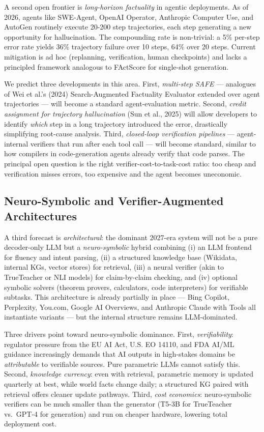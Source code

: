 \documentclass{article}
\begin{document}
A second open frontier is \emph{long-horizon factuality} in agentic deployments. As of 2026, agents like SWE-Agent, OpenAI Operator, Anthropic Computer Use, and AutoGen routinely execute 20-200 step trajectories, each step generating a new opportunity for hallucination. The compounding rate is non-trivial: a 5\% per-step error rate yields 36\% trajectory failure over 10 steps, 64\% over 20 steps. Current mitigation is ad hoc (replanning, verification, human checkpoints) and lacks a principled framework analogous to FActScore for single-shot generation.

We predict three developments in this area. First, \emph{multi-step SAFE} --- analogues of Wei et al.'s (2024) Search-Augmented Factuality Evaluator extended over agent trajectories --- will become a standard agent-evaluation metric. Second, \emph{credit assignment for trajectory hallucination} (Sun et al., 2025) will allow developers to identify \emph{which} step in a long trajectory introduced the error, drastically simplifying root-cause analysis. Third, \emph{closed-loop verification pipelines} --- agent-internal verifiers that run after each tool call --- will become standard, similar to how compilers in code-generation agents already verify that code parses. The principal open question is the right verifier-cost-to-task-cost ratio: too cheap and verification misses errors, too expensive and the agent becomes uneconomic.

\subsection{Neuro-Symbolic and Verifier-Augmented Architectures}\label{neuro-symbolic-and-verifier-augmented-architectures}

A third forecast is \emph{architectural}: the dominant 2027-era system will not be a pure decoder-only LLM but a \emph{neuro-symbolic} hybrid combining (i) an LLM frontend for fluency and intent parsing, (ii) a structured knowledge base (Wikidata, internal KGs, vector stores) for retrieval, (iii) a neural verifier (akin to TrueTeacher or NLI models) for claim-by-claim checking, and (iv) optional symbolic solvers (theorem provers, calculators, code interpreters) for verifiable subtasks. This architecture is already partially in place --- Bing Copilot, Perplexity, You.com, Google AI Overviews, and Anthropic Claude with Tools all instantiate variants --- but the internal structure remains LLM-dominated.

Three drivers point toward neuro-symbolic dominance. First, \emph{verifiability}: regulator pressure from the EU AI Act, U.S. EO 14110, and FDA AI/ML guidance increasingly demands that AI outputs in high-stakes domains be \emph{attributable} to verifiable sources. Pure parametric LLMs cannot satisfy this. Second, \emph{knowledge currency}: even with retrieval, parametric memory is updated quarterly at best, while world facts change daily; a structured KG paired with retrieval offers cleaner update pathways. Third, \emph{cost economics}: neuro-symbolic verifiers can be much smaller than the generator (T5-3B for TrueTeacher vs.~GPT-4 for generation) and run on cheaper hardware, lowering total deployment cost.
\end{document}
